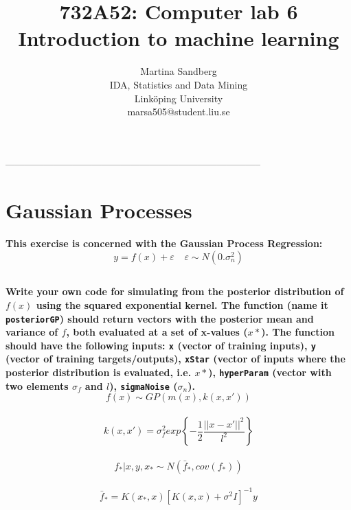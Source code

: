 \documentclass[a4paper]{article}
\title{732A52: Computer lab 6 \\
 Introduction to machine learning}
\author{Martina Sandberg
\small
\\IDA, Statistics and Data Mining
\\Linköping University
\\marsa505@student.liu.se}
\begin{document}
\maketitle
\begin{center}
--------------------------------------------------------------------------------\\
\end{center}

\section{Gaussian Processes}
\textbf{This exercise is concerned with the Gaussian Process Regression:}\\

\[ y=f(x) + \varepsilon \,\,\,\,\,\ \varepsilon\sim N(0.\sigma^2_n) \]

\subsection{}
\textbf{Write your own code for simulating from the posterior distribution of $f(x)$ using the squared exponential kernel. The function (name it \texttt{posteriorGP}) should return vectors with the posterior mean and variance of $f$, both evaluated at a set of x-values ($x*$). The function should have the following inputs: \texttt{x} (vector of training inputs), \texttt{y} (vector of training targets/outputs), \texttt{xStar} (vector of inputs where the posterior distribution is evaluated, i.e. $x*$), \texttt{hyperParam} (vector with two elements $\sigma_f$ and $l$), \texttt{sigmaNoise} ($\sigma_n$). }\\

\begin{equation}
 f(x) \sim GP(m(x),k(x,x')) 
\end{equation}\\

\begin{equation}
k(x,x') = \sigma^2_f exp\left\{ -\frac{1}{2} \frac{||x-x'||^2}{l^2} \right\}
\end{equation}\\

\begin{equation}
 f_* | x,y,x_* \sim N(\bar{f}_*, cov(f_*))
\end{equation}\\

\begin{equation}
 \bar{f}_* = K(x_*,x) [K(x,x)+\sigma^2I]^{-1}y
\end{equation}\\
\end{document}
